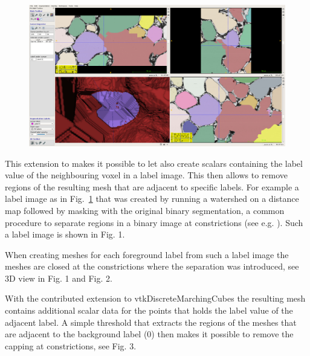 \documentclass{InsightArticle}
\begin{document}
\begin{figure}[!b]
\center
\includegraphics[width=\textwidth]{images/vtkDiscreteMarchingCubes_extension_07}
\label{fig:labelimage}
\end{figure}


This extension to  makes it possible to let  also create  scalars containing the label value of the neighbouring voxel in a label image. This then allows to remove regions of the resulting mesh that are adjacent to specific labels. For example a label image as in Fig.~\ref{fig:labelimage} that was created by running a watershed on a distance map followed by masking with the original binary segmentation, a common procedure to separate regions in a binary image at constrictions (see e.g. \citet{Beare2006b}). Such a label image is shown in Fig. 1.

When creating meshes for each foreground label from such a label image the meshes are closed at the constrictions where the separation was introduced, see 3D view in Fig. 1 and Fig. 2.

With the contributed extension to vtkDiscreteMarchingCubes the resulting mesh contains additional scalar data for the points that holds the label value of the adjacent label. A simple threshold that extracts the regions of the meshes that are adjacent to the background label (0) then makes it possible to remove the capping at constrictions, see Fig. 3.
\end{document}
